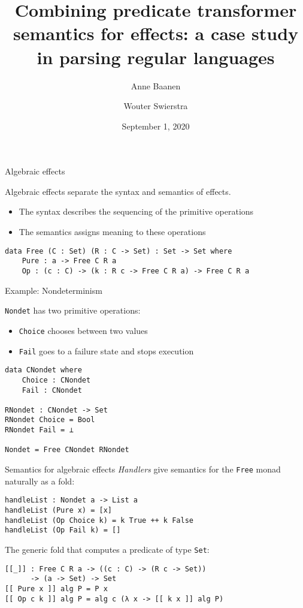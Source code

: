 \documentclass{beamer}
\title[Combining predicate transformer semantics]{Combining predicate transformer semantics for effects: a case study in parsing regular languages}
\author{Anne Baanen \and Wouter Swierstra}
\date{September 1, 2020}
\newcommand{\Agda}[1]{\texttt{\footnotesize #1}\xspace}
\newcommand{\Free}{\Agda{Free}}
\newcommand{\Set}{\Agda{Set}}
\begin{document}
\titlepage
\begin{frame}[fragile]{Algebraic effects}

Algebraic effects separate the syntax and semantics of effects.

\begin{itemize}
	\item The syntax describes the sequencing of the primitive operations
	\item The semantics assigns meaning to these operations
\end{itemize}

\begin{verbatim}
data Free (C : Set) (R : C -> Set) : Set -> Set where
	Pure : a -> Free C R a
	Op : (c : C) -> (k : R c -> Free C R a) -> Free C R a
\end{verbatim}
\end{frame}

\begin{frame}[fragile]{Example: Nondeterminism}

\Agda{Nondet} has two primitive operations:
\begin{itemize}
    \item \Agda{Choice} chooses between two values
    \item \Agda{Fail} goes to a failure state and stops execution
\end{itemize}
\begin{verbatim}
data CNondet where
	Choice : CNondet
	Fail : CNondet

RNondet : CNondet -> Set
RNondet Choice = Bool
RNondet Fail = ⊥

Nondet = Free CNondet RNondet
\end{verbatim}
\end{frame}

\begin{frame}[fragile]{Semantics for algebraic effects}
\emph{Handlers} give semantics for the \Free monad naturally as a fold:
\begin{verbatim}
handleList : Nondet a -> List a
handleList (Pure x) = [x]
handleList (Op Choice k) = k True ++ k False
handleList (Op Fail k) = []
\end{verbatim}

\pause
The generic fold that computes a predicate of type \Set:
\begin{verbatim}
[[_]] : Free C R a -> ((c : C) -> (R c -> Set))
      -> (a -> Set) -> Set
[[ Pure x ]] alg P = P x
[[ Op c k ]] alg P = alg c (λ x -> [[ k x ]] alg P)
\end{verbatim}
\end{frame}
\end{document}
